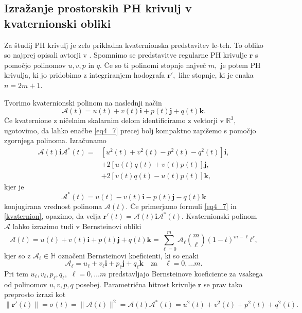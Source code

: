 \documentclass[12pt,a4paper,twoside]{article}
\theoremstyle{definition} %
\theoremstyle{plain} %
\theoremstyle{primerstyle}
\numberwithin{equation}{section}  %
\newcommand{\R}{\mathbb R}
\newcommand{\quat}{\mathbb H}
\newcommand{\rV}{\mathbf{r}}
\newcommand{\iV}{\mathbf{i}}
\newcommand{\jV}{\mathbf{j}}
\newcommand{\kV}{\mathbf{k}}
\newcommand{\AQ}{\mathcal{A}}
\begin{document}
\subsection{Izražanje prostorskih PH krivulj v kvaternionski obliki}
\label{PH_kvaternioni}

Za študij PH krivulj je zelo prikladna kvaternionska predstavitev le-teh. To obliko so najprej opisali avtorji v \cite{choi2002clifford}. Spomnimo se predstavitve regularne PH krivulje $\rV$ s pomočjo polinomov $u,v,p$ in $q.$ Če so ti polinomi stopnje največ $m,$ je potem PH krivulja, ki jo pridobimo z integriranjem hodografa $\rV',$ lihe stopnje, ki je enaka $n=2m+1.$

Tvorimo kvaternionski polinom na naslednji način
\begin{equation}
	\AQ(t)=u(t)+v(t)\iV+p(t)\jV+q(t)\kV.
\end{equation}
Če kvaternione z ničelnim skalarnim delom identificiramo z vektorji v $\R^3,$ ugotovimo, da lahko enačbe \eqref{eq4_7} precej bolj kompaktno zapišemo s pomočjo zgornjega polinoma. Izračunamo
\begin{align}
	\AQ(t)\iV\AQ^*(t)=&[u^2(t)+v^2(t)-p^2(t)-q^2(t)]\iV, \nonumber \\
	&+2[u(t)q(t)+v(t)p(t)]\jV, \label{kvaternion} \\
	&+2[v(t)q(t)-u(t)p(t)]\kV, \nonumber
\end{align}
kjer je
\begin{equation}
	\AQ^*(t)=u(t)-v(t)\iV-p(t)\jV-q(t)\kV
\end{equation}
konjugirana vrednost polinoma $\AQ(t).$ Če primerjamo formuli \eqref{eq4_7} in \eqref{kvaternion}, opazimo, da velja $\rV'(t)=\AQ(t)\iV\AQ^*(t).$ Kvaternionski polinom $\AQ$ lahko izrazimo tudi v Bernsteinovi obliki
\begin{equation}
	\AQ(t)=u(t)+v(t)\iV+p(t)\jV+q(t)\kV=\sum_{\ell=0}^m\AQ_{\ell} \binom{m}{\ell}(1-t)^{m-\ell}t^{\ell},
\end{equation}
kjer so z $\AQ_{\ell}\in\quat$ označeni Bernsteinovi koeficienti, ki so enaki
\begin{equation}
	\label{bern_koef_quat}
	\AQ_{\ell}=u_{\ell}+v_{\ell}\iV+p_{\ell}\jV+q_{\ell}\kV \quad \text{za} \quad \ell=0,\dots m.
\end{equation}
Pri tem $u_{\ell},v_{\ell},p_{\ell},q_{\ell},$ $\ell=0,\dots m$ predstavljajo Bernsteinove koeficiente za vsakega od polinomov $u,v,p,q$ posebej. Parametrična hitrost krivulje $\rV$ se prav tako preprosto izrazi kot
\begin{equation}
	\label{kvaternionska_hitrost}
	\lVert \rV'(t) \rVert=\sigma(t)=\lVert \AQ(t) \rVert^2=\AQ(t) \AQ^*(t)=u^2(t)+v^2(t)+p^2(t)+q^2(t).
\end{equation}
\end{document}
